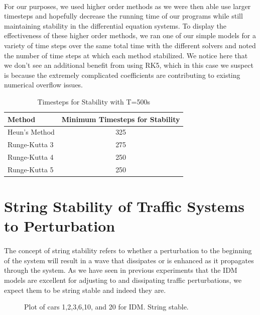 \documentclass[12pt]{article}
\begin{document}
\paragraph{}For our purposes, we used higher order methods as we were then able use larger timesteps and hopefully decrease the running time of our programs while still maintaining stability in the differential equation systems. To display the effectiveness of these higher order methods, we ran one of our simple models for a variety of time steps over the same total time with the different solvers and noted the number of time steps at which each method stabilized. We notice here that we don't see an additional benefit from using RK5, which in this case we suspect is because the extremely complicated coefficients are contributing to existing numerical overflow issues.\\
\begin{table}[H]
\centering
\caption{Timesteps for Stability with T=500s}
\label{my-label}
\begin{tabular}{lc}
 Method &  Minimum Timesteps for Stability\\ \hline
 Heun's Method & 325 \\
 Runge-Kutta 3 &  275\\
 Runge-Kutta 4 &  250\\
 Runge-Kutta 5 & 250
\end{tabular}
\end{table}

\section{String Stability of Traffic Systems to Perturbation}

\paragraph{}The concept of string stability refers to whether a perturbation to the beginning of the system will result in a wave that dissipates or is enhanced as it propagates through the system. As we have seen in previous experiments that the IDM models are excellent for adjusting to and dissipating traffic perturbations, we expect them to be string stable and indeed they are.

\begin{figure}[H]
  \centering
  \caption{Plot of cars 1,2,3,6,10, and 20 for IDM. String stable.}
\end{figure}
\end{document}
